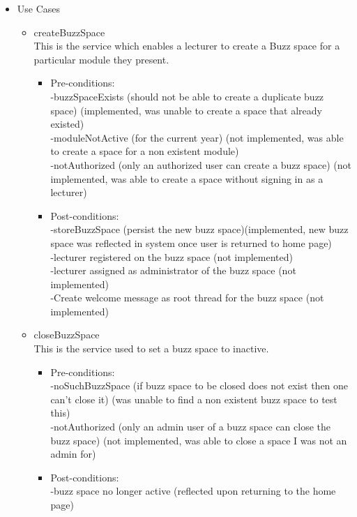 \begin {itemize}
\item Use Cases
\begin {itemize}
\item {createBuzzSpace}\\
This is the service which enables a lecturer to create a Buzz space for a particular module they present.
\begin {itemize}
\item Pre-conditions:\\
-buzzSpaceExists (should not be able to create a duplicate buzz space) (implemented, was unable to create a space that already existed)\\
-moduleNotActive (for the current year) (not implemented, was able to create a space for a non existent module)\\
-notAuthorized (only an authorized user can create a buzz space) (not implemented, was able to create a space without signing in as a lecturer)\\

\item Post-conditions:\\
-storeBuzzSpace (persist the new buzz space)(implemented, new buzz space was reflected in system once user is returned to home page)\\
-lecturer registered on the buzz space (not implemented)\\
-lecturer assigned as administrator of the buzz space (not implemented)\\
-Create welcome message as root thread for the buzz space (not implemented)\\
\end {itemize}




\item {closeBuzzSpace}\\
This is the service used to set a buzz space to inactive.
\begin {itemize}
\item Pre-conditions: \\
-noSuchBuzzSpace (if buzz space to be closed does not exist then one can't close it) (was unable to find a non existent buzz space to test this)\\
        -notAuthorized (only an admin user of a buzz space can close the buzz space) (not implemented, was able to close a space I was not an admin for)\\
\item Post-conditions:\\
-buzz space no longer active (reflected upon returning to the home page)\\
\end{itemize}


\end{itemize}
\end{itemize}

